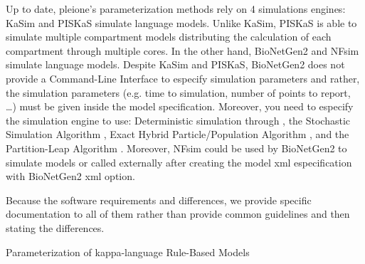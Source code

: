 \documentclass[letterpaper,10pt,english]{sphinxmanual}
\begin{document}
Up to date, pleione’s parameterization methods rely on 4 simulations engines:
KaSim and PISKaS simulate  language models. Unlike KaSim, PISKaS is able
to simulate multiple compartment models distributing the calculation of each
compartment through multiple cores. In the other hand, BioNetGen2 and NFsim
simulate  language models. Despite KaSim and PISKaS, BioNetGen2 does
not provide a Command-Line Interface to especify simulation parameters and
rather, the simulation parameters (e.g. time to simulation, number of points to
report, …) must be given inside the model specification. Moreover, you need to
especify the simulation engine to use: Deterministic simulation through ,
the Stochastic Simulation Algorithm , Exact Hybrid Particle/Population
Algorithm , and the Partition-Leap Algorithm . Moreover, NFsim could
be used by BioNetGen2 to simulate models or called externally after creating the
model xml especification with BioNetGen2 \textendash{}xml option.

Because the software requirements and differences, we provide specific
documentation to all of them rather than provide common guidelines and then
stating the differences.

Parameterization of kappa-language Rule-Based Models
\end{document}
